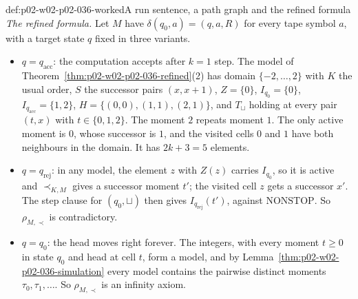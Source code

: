 \begin{hbexample}{def:p02-w02-p02-036-worked}{A run sentence, a path graph and the refined formula}
\emph{The refined formula.}  Let \(M\) have \(\delta(q_0,a)=(q,a,R)\) for every
tape symbol \(a\), with a target state \(q\) fixed in three variants.
\begin{itemize}
\item \(q=q_{\mathrm{acc}}\): the computation accepts after \(k=1\) step.  The
  model of Theorem~\ref{thm:p02-w02-p02-036-refined}(2) has domain
  \(\{-2,\ldots,2\}\) with \(K\) the usual order, \(S\) the successor pairs
  \((x,x+1)\), \(Z=\{0\}\), \(I_{q_0}=\{0\}\), \(I_{q_{\mathrm{acc}}}=\{1,2\}\),
  \(H=\{(0,0),(1,1),(2,1)\}\), and \(T_{\sqcup}\) holding at every pair
  \((t,x)\) with \(t\in\{0,1,2\}\).  The moment \(2\) repeats moment \(1\).  The
  only active moment is \(0\), whose successor is \(1\), and the visited cells
  \(0\) and \(1\) have both neighbours in the domain.  It has \(2k+3=5\)
  elements.
\item \(q=q_{\mathrm{rej}}\): in any model, the element \(z\) with \(Z(z)\)
  carries \(I_{q_0}\), so it is active and \(\prec_{K,M}\) gives a successor
  moment \(t'\); the visited cell \(z\) gets a successor \(x'\).  The step
  clause for \((q_0,\sqcup)\) then gives \(I_{q_{\mathrm{rej}}}(t')\), against
  \(\mathrm{NONSTOP}\).  So \(\rho_{M,\prec}\) is contradictory.
\item \(q=q_0\): the head moves right forever.  The integers, with every
  moment \(t\geq0\) in state \(q_0\) and head at cell \(t\), form a model, and
  by Lemma~\ref{thm:p02-w02-p02-036-simulation} every model contains the
  pairwise distinct moments \(\tau_0,\tau_1,\ldots\).  So \(\rho_{M,\prec}\) is
  an infinity axiom.
\end{itemize}
\end{hbexample}

